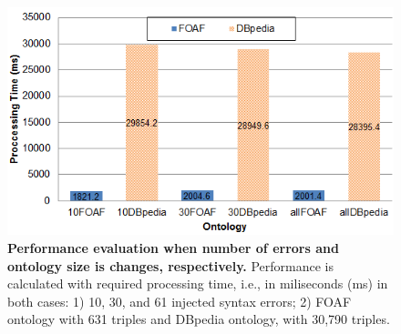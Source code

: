 \begin{figure}[ht]
\begin{center}
		\includegraphics[scale=0.9,angle=0]{images/Experiment03-03.png}
		\setlength\abovecaptionskip{-20mm}
		\setlength\belowcaptionskip{-5mm}
		\caption{\textbf{Performance evaluation when number of errors and ontology size is changes, respectively.} 
		Performance is calculated with required processing time, i.e., in miliseconds (ms) in both cases: 1) 10, 30, and 61 injected syntax errors; 2) FOAF ontology with 631 triples and DBpedia ontology, with 30,790 triples.}
\label{Fig:Experiment03-03}

\end{center}
\end{figure}
